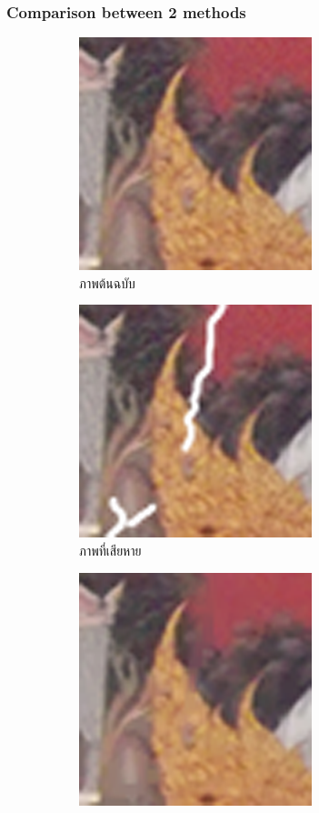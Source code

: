 \documentclass[xcolor=dvipsnames, xetex,serif]{beamer}
\begin{document}
    \begin{frame}
        \frametitle{Comparison between 2 methods}
        \begin{figure}[H]
            \centering
            \begin{subfigure}{0.4\linewidth}
                \centering
                \includegraphics[width=0.6\linewidth]{images/result_ex4_scaleup/original.png}
                \caption{ภาพต้นฉบับ}
            \end{subfigure}
            \begin{subfigure}{0.4\linewidth}
                \centering
                \includegraphics[width=0.6\linewidth]{images/result_ex4_scaleup/toinpaint.png}
                \caption{ภาพที่เสียหาย}
            \end{subfigure}
            \begin{subfigure}{0.4\linewidth}
                \centering
                \includegraphics[width=0.6\linewidth]{images/result_ex4_scaleup/splitbregman.png}			

\end{subfigure}
\end{figure}
\end{frame}
\end{document}
